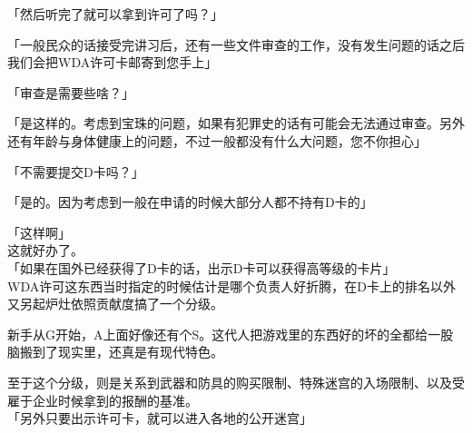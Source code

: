 「然后听完了就可以拿到许可了吗？」

「一般民众的话接受完讲习后，还有一些文件审查的工作，没有发生问题的话之后我们会把WDA许可卡邮寄到您手上」

「审查是需要些啥？」

「是这样的。考虑到宝珠的问题，如果有犯罪史的话有可能会无法通过审查。另外还有年龄与身体健康上的问题，不过一般都没有什么大问题，您不你担心」

「不需要提交D卡吗？」

「是的。因为考虑到一般在申请的时候大部分人都不持有D卡的」

「这样啊」\\

这就好办了。\\

「如果在国外已经获得了D卡的话，出示D卡可以获得高等级的卡片」\\

WDA许可这东西当时指定的时候估计是哪个负责人好折腾，在D卡上的排名以外又另起炉灶依照贡献度搞了一个分级。

新手从G开始，A上面好像还有个S。这代人把游戏里的东西好的坏的全都给一股脑搬到了现实里，还真是有现代特色。

至于这个分级，则是关系到武器和防具的购买限制、特殊迷宫的入场限制、以及受雇于企业时候拿到的报酬的基准。\\

「另外只要出示许可卡，就可以进入各地的公开迷宫」

